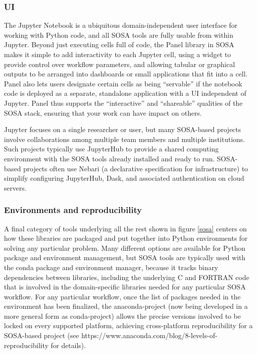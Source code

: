 \subsubsection{UI}

The Jupyter Notebook is a ubiquitous domain-independent user interface for working with Python code, and all SOSA tools are fully usable from within Jupyter. Beyond just executing cells full of code, the Panel library in SOSA makes it simple to add interactivity to each Jupyter cell, using a widget to provide control over workflow parameters, and allowing tabular or graphical outputs to be arranged into dashboards or small applications that fit into a cell. Panel also lets users designate certain cells as being ``servable'' if the notebook code is deployed as a separate, standalone application with a UI independent of Jupyter. Panel thus supports the ``interactive'' and ``shareable'' qualities of the SOSA stack, ensuring that your work can have impact on others.

Jupyter focuses on a single researcher or user, but many SOSA-based projects involve collaborations among multiple team members and multiple institutions. Such projects typically use JupyterHub to provide a shared computing environment with the SOSA tools already installed and ready to run. SOSA-based projects often use Nebari (a declarative specification for infrastructure) to simplify configuring JupyterHub, Dask, and associated authentication on cloud servers.

\subsubsection{Environments and reproducibility}

A final category of tools underlying all the rest shown in figure \ref{sosa} centers on how these libraries are packaged and put together into Python environments for solving any particular problem. Many different options are available for Python package and environment management, but SOSA tools are typically used with the conda package and environment manager, because it tracks binary dependencies between libraries, including the underlying C and FORTRAN code that is involved in the domain-specific libraries needed for any particular SOSA workflow. For any particular workflow, once the list of packages needed in the environment has been finalized, the anaconda-project (now being developed in a more general form as conda-project) allows the precise versions involved to be locked on every supported platform, achieving cross-platform reproducibility for a SOSA-based project (see
https://www.anaconda.com/blog/8-levels-of-reproducibility for details).


